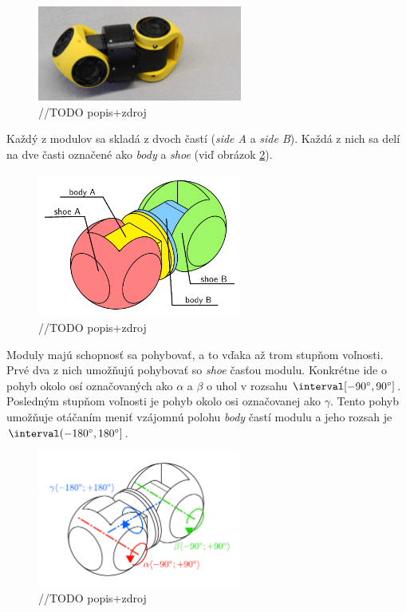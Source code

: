 \documentclass[
  digital, %
  twoside, %
  table,   %
  nolof,     %
  nolot,     %
]{fithesis3}
\begin{document}
\begin{figure}[htbp]
    \centering
    \includegraphics[width=0.6\textwidth]{pictures/module.jpg}
    \caption{//TODO popis+zdroj}
    \label{fig:module}
\end{figure}

Každý z modulov sa skladá z dvoch častí (\textit{side A} a \textit{side B}). Každá z nich sa delí na dve časti označené ako \textit{body} a \textit{shoe} (viď obrázok \ref{fig:module_parts}). 

\begin{figure}[htbp]
    \centering
    \includegraphics[width=0.6\textwidth]{pictures/module_parts.pdf}
    \caption{//TODO popis+zdroj}
    \label{fig:module_parts}
\end{figure}

Moduly majú schopnosť sa pohybovať, a to vďaka až trom stupňom voľnosti. Prvé dva z nich umožňujú pohybovať so \textit{shoe} časťou modulu. Konkrétne ide o pohyb okolo osí označovaných ako $\alpha$ a $\beta$  o uhol v rozsahu $\interval[{-90\degree, 90\degree}]$. Posledným stupňom voľnosti je pohyb okolo osi označovanej ako $\gamma$. Tento pohyb umožňuje otáčaním meniť vzájomnú polohu \textit{body} častí modulu a jeho rozsah je $\interval({-180\degree, 180\degree}]$. 

\begin{figure}[htbp]
    \centering
    \includegraphics[width=0.6\textwidth]{pictures/module_angles.pdf}
    \caption{//TODO popis+zdroj}
    \label{fig:module_angle}
\end{figure}
\end{document}
